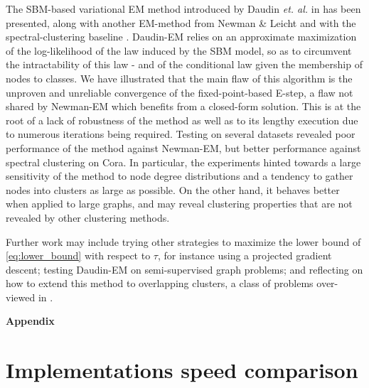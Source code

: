 \documentclass[switch, 12pt]{article}
\begin{document}
\begin{multicols}{2}
    The SBM-based variational EM method introduced by Daudin \textit{et. al.} in \cite{main_article} has been presented, along with another EM-method from Newman \& Leicht \cite{newman} and with the spectral-clustering baseline \cite{spectral}. Daudin-EM relies on an approximate maximization of the log-likelihood of the law induced by the SBM model, so as to circumvent the intractability of this law - and of the conditional law given the membership of nodes to classes. We have illustrated that the main flaw of this algorithm is the unproven and unreliable convergence of the fixed-point-based E-step, a flaw not shared by Newman-EM which benefits from a closed-form solution. This is at the root of a lack of robustness of the method as well as to its lengthy execution due to numerous iterations being required. Testing on several datasets revealed poor performance of the method against Newman-EM, but better performance against spectral clustering on Cora. In particular, the experiments hinted towards a large sensitivity of the method to node degree distributions and a tendency to gather nodes into clusters as large as possible.  On the other hand, it behaves better when applied to large graphs, and may reveal clustering properties that are not revealed by other clustering methods.

    Further work may include trying other strategies to maximize the lower bound of \eqref{eq:lower_bound} with respect to $\tau$, for instance using a projected gradient descent; testing Daudin-EM on semi-supervised graph problems; and reflecting on how to extend this method to overlapping clusters, a class of problems over-viewed in \cite{xie_overlapping_2013}.


    \newpage

    

\end{multicols}

\newpage


\appendix

\begin{center}
    {\Huge \bfseries Appendix} \\[0.5cm]
\end{center}

\section{Implementations speed comparison}
\label{app:speed_comparison}
\end{document}
